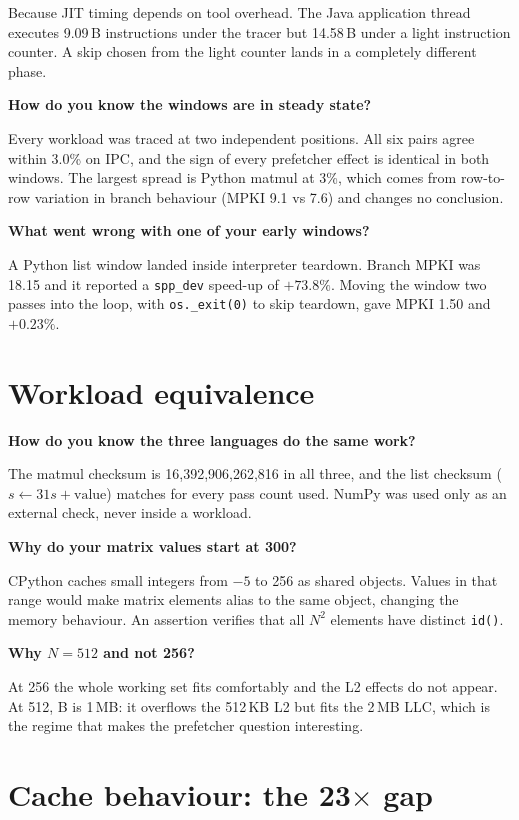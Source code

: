 \documentclass[11pt,a4paper]{article}
\newcommand{\Q}[1]{\begin{question}\textbf{#1}\end{question}}
\begin{document}
Because JIT timing depends on tool overhead. The Java application thread executes
9.09\,B instructions under the tracer but 14.58\,B under a light instruction counter.
A skip chosen from the light counter lands in a completely different phase.

\Q{How do you know the windows are in steady state?}

Every workload was traced at two independent positions. All six pairs agree within
3.0\% on IPC, and the sign of every prefetcher effect is identical in both windows.
The largest spread is Python matmul at 3\%, which comes from row-to-row variation in
branch behaviour (MPKI 9.1 vs 7.6) and changes no conclusion.

\Q{What went wrong with one of your early windows?}

A Python list window landed inside interpreter teardown. Branch MPKI was 18.15 and it
reported a \texttt{spp\_dev} speed-up of $+73.8\%$. Moving the window two passes into
the loop, with \texttt{os.\_exit(0)} to skip teardown, gave MPKI 1.50 and $+0.23\%$.

\section{Workload equivalence}

\Q{How do you know the three languages do the same work?}

The matmul checksum is 16{,}392{,}906{,}262{,}816 in all three, and the list checksum
($s \leftarrow 31s + \text{value}$) matches for every pass count used. NumPy was used
only as an external check, never inside a workload.

\Q{Why do your matrix values start at 300?}

CPython caches small integers from $-5$ to 256 as shared objects. Values in that range
would make matrix elements alias to the same object, changing the memory behaviour. An
assertion verifies that all $N^2$ elements have distinct \texttt{id()}.

\Q{Why $N = 512$ and not 256?}

At 256 the whole working set fits comfortably and the L2 effects do not appear. At 512,
B is 1\,MB: it overflows the 512\,KB L2 but fits the 2\,MB LLC, which is the regime that
makes the prefetcher question interesting.

\section{Cache behaviour: the 23\texorpdfstring{$\times$}{x} gap}
\end{document}
